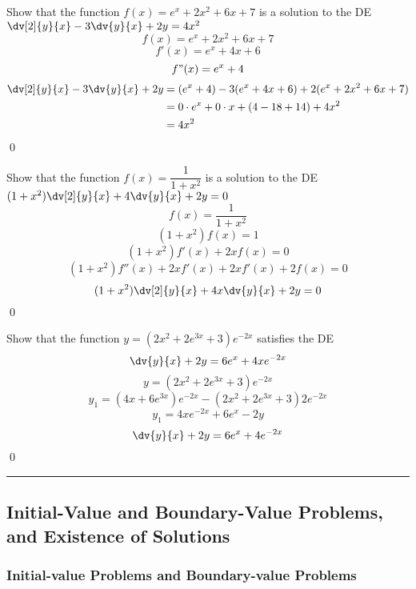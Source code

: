 \begin{example}{
    Show that the function $f(x) = e^x+2x^2+6x+7$ is a solution to the DE $\dv[2]{y}{x} - 3\dv{y}{x} + 2y = 4x^2$ 
}{}
    \[ f(x) = e^x + 2x^2 + 6x + 7 \]
    \[ f'(x) = e^x + 4x + 6 \]
    \[ f"(x) = e^x + 4 \]
    \begin{align*}
        \dv[2]{y}{x} - 3\dv{y}{x} + 2y &= (e^x+4) - 3(e^x+4x+6) + 2(e^x+2x^2+6x+7) \\
        &= 0\cdot e^x + 0\cdot x + (4-18+14) + 4x^2 \\
        &= 4x^2
    \end{align*} \qed
\end{example}

\begin{example}{
    Show that the function $f(x) = \dfrac{1}{1+x^2}$ is a solution to the DE $(1+x^2)\dv[2]{y}{x} + 4\dv{y}{x} + 2y = 0$ 
}{}
    \[ f(x) = \frac{1}{1+x^2} \]
    \[ (1+x^2)f(x) = 1 \]
    \[ (1+x^2)f'(x) + 2xf(x) = 0 \]
    \[ (1+x^2)f''(x) + 2xf'(x) + 2xf'(x) + 2f(x) = 0 \]
    \[
        (1+x^2) \dv[2]{y}{x} + 4x \dv{y}{x} + 2y = 0
    \] \qed
\end{example}

\begin{example}{
    Show that the function $y = (2x^2+2e^{3x}+3)e^{-2x}$ satisfies the DE \[
        \dv{y}{x} + 2y = 6e^x + 4xe^{-2x}
\]}{}
    \[ y = ( 2x^2 + 2e^{3x} + 3 ) e^{-2x} \]
    \[ y_1 = ( 4x + 6e^{3x} )e^{-2x} - ( 2x^2 + 2e^{3x} + 3 )2e^{-2x} \]
    \[ y_1 = 4xe^{-2x} + 6e^x - 2y \]
    \[
        \dv{y}{x} + 2y = 6e^x + 4e^{-2x}
    \] \qed
\end{example}



\vspace{20pt}\rule{3in}{1pt}
\subsection{Initial-Value and Boundary-Value Problems, and Existence of Solutions}


\subsubsection{Initial-value Problems and Boundary-value Problems}

